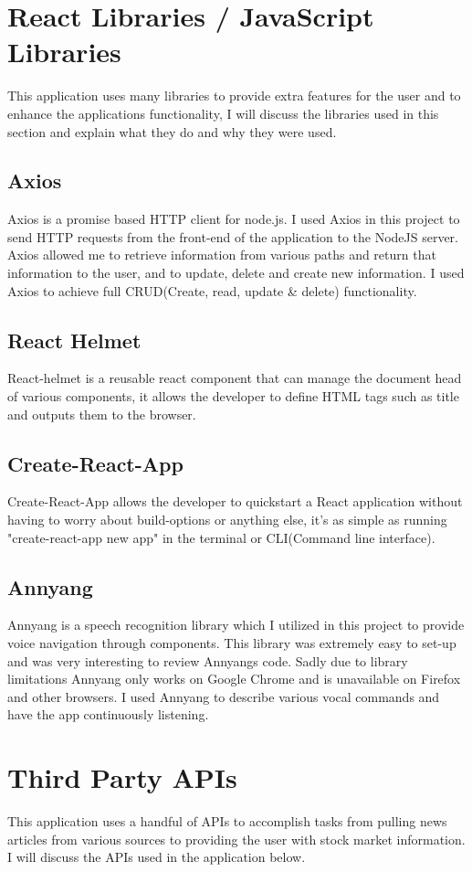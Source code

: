 \section{React Libraries / JavaScript Libraries}
This application uses many libraries to provide extra features for the user and to enhance the applications functionality, I will discuss the libraries used in this section and explain what they do and why they were used.
\subsection{Axios}
Axios is a promise based HTTP client for node.js\cite{Axios}.  I used Axios in this project to send HTTP requests from the front-end of the application to the NodeJS server.  Axios allowed me to retrieve information from various paths and return that information to the user, and to update, delete and create new information.  I used Axios to achieve full CRUD(Create, read, update \& delete) functionality.
\subsection{React Helmet}
React-helmet is a reusable react component that can manage the document head of various components, it allows the developer to define HTML tags such as title and outputs them to the browser\cite{ReactHelmet}.
\subsection{Create-React-App}
Create-React-App allows the developer to quickstart a React application without having to worry about build-options or anything else, it's as simple as running "create-react-app new app" in the terminal or CLI(Command line interface)\cite{CreateReactApp}.
\subsection{Annyang}
Annyang is a speech recognition library which I utilized in this project to provide voice navigation through components.  This library was extremely easy to set-up and was very interesting to review Annyangs code.  Sadly due to library limitations Annyang only works on Google Chrome and is unavailable on Firefox and other browsers.  I used Annyang to describe various vocal commands and have the app continuously listening.
\section{Third Party APIs}
This application uses a handful of APIs to accomplish tasks from pulling news articles from various sources to providing the user with stock market information.  I will discuss the APIs used in the application below.

